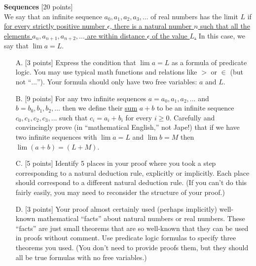 \documentclass[12pt,letterpaper,boxed,cm]{hmcpset}
\begin{document}

\begin{problem}[1.]
    \textbf{Sequences} [20 points]\\
    We say that an infinite sequence $a_0,a_1,a_2,a_3,\ldots$ of real numbers has the limit $L$ if \ul{for every strictly positive number $\epsilon$, there is a natural number $n$ such that all the elements $a_n,a_{n+1},a_{n+2},\ldots$  are within distance $\epsilon$ of the value $L$.} In this case, we say that $\lim a = L$.
    \begin{enumerate}
        \item [A.] [3 points] Express the condition that $\lim a = L$ as a formula of predicate logic. You may use typical math functions and relations like $>$ or $\in$ (but not ``$\ldots$'').   Your formula should only have two free variables: $a$ and $L$.
        \item [B.] [9 points] For any two infinite sequences $a = a_0,a_1,a_2,\ldots$ and $b  =  b_0,b_1,b_2,\ldots$ then we define their \ul{sum} $a+b$ to be an infinite sequence $c_0,c_1,c_2,c_3,\ldots$ such that $c_i = a_i + b_i$ for every $i\ge0$. Carefully and convincingly prove (in “mathematical English,” not Jape!) that if we have two infinite sequences with $\lim a = L$  and  $\lim b = M$  then $\lim (a+b) = (L+M)$. 
        \item [C.] [5 points] Identify 5 places in your proof where you took a step corresponding to a natural deduction rule, explicitly or implicitly. Each place should correspond to a different natural deduction rule.  (If you can’t do this fairly easily, you may need to reconsider the structure of your proof.)
        \item [D.] [3 points] Your proof almost certainly used (perhaps implicitly) well-known mathematical “facts” about natural numbers or real numbers.  These “facts” are just small theorems that are so well-known that they can be used in proofs without comment. Use predicate logic formulas to specify three theorems you used. (You don’t need to provide proofs them, but they should all be true formulas with no free variables.)
    \end{enumerate}
\end{problem}

\begin{solution}
    \vfill
\end{solution}
\newpage
\end{document}
